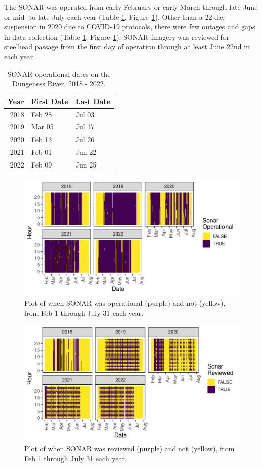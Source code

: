 \documentclass[
]{article}
\begin{document}
The SONAR was operated from early February or early March through late June or mid- to late July each year (Table \ref{tab:op-dates}, Figure \ref{fig:op-fig}). Other than a 22-day suspension in 2020 due to COVID-19 protocols, there were few outages and gaps in data collection (Table \ref{tab:op-dates}, Figure \ref{fig:op-fig}). SONAR imagery was reviewed for steelhead passage from the first day of operation through at least June 22nd in each year.

\begin{table}[!h]

\caption{\label{tab:op-dates}SONAR operational dates on the Dungeness River, 2018 - 2022.}
\centering
\begin{tabular}[t]{rll}
\toprule
Year & First Date & Last Date\\
\midrule
2018 & Feb 28 & Jul 03\\
2019 & Mar 05 & Jul 17\\
2020 & Feb 13 & Jul 26\\
2021 & Feb 01 & Jun 22\\
2022 & Feb 09 & Jun 25\\
\bottomrule
\end{tabular}
\end{table}

\begin{figure}
\centering
\includegraphics{../figures/op-fig-1.pdf}
\caption{\label{fig:op-fig}Plot of when SONAR was operational (purple) and not (yellow), from Feb 1 through July 31 each year.}
\end{figure}

\begin{figure}
\centering
\includegraphics{../figures/review-fig-1.pdf}
\caption{\label{fig:review-fig}Plot of when SONAR was reviewed (purple) and not (yellow), from Feb 1 through July 31 each year.}
\end{figure}
\end{document}
